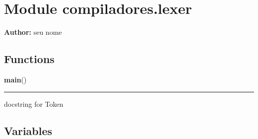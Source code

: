 %
%
%


\section{Module compiladores.lexer}

    \label{compiladores:lexer}
\textbf{Author:} seu nome





  \subsection{Functions}

    \label{compiladores:lexer:main}

    \vspace{0.5ex}

\hspace{.8\funcindent}\begin{boxedminipage}{\funcwidth}

    \raggedright \textbf{main}()

    \vspace{-1.5ex}

    \rule{\textwidth}{0.5\fboxrule}
\setlength{\parskip}{2ex}
    docstring for Token

\setlength{\parskip}{1ex}
    \end{boxedminipage}



  \subsection{Variables}


